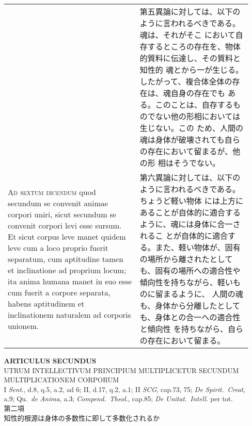 \documentclass[paper=a4paper,fontsize=10pt,jafontsize=9pt,titlepage]{jlreq}
\begin{document}
\begin{longtable}{p{21em}p{21em}}
&

 第五異論に対しては、以下のように言われるべきである。魂は、それがそこ
 において自存するところの存在を、物体的質料に伝達し、その質料と知性的
 魂とから一が生じる。したがって、複合体全体の存在は、魂自身の存在でも
 ある。このことは、自存するものでない他の形相においては生じない。この
 ため、人間の魂は身体が破壊されても自らの存在において留まるが、他の形
 相はそうでない。
 
\\


 {\scshape Ad sextum dicendum} quod secundum se convenit animae
 corpori uniri, sicut secundum se convenit corpori levi esse
 sursum. Et sicut corpus leve manet quidem leve cum a loco proprio
 fuerit separatum, cum aptitudine tamen et inclinatione ad proprium
 locum; ita anima humana manet in suo esse cum fuerit a corpore
 separata, habens aptitudinem et inclinationem naturalem ad corporis
 unionem.
 
&

 第六異論に対しては、以下のように言われるべきである。ちょうど軽い物体
 には上方にあることが自体的に適合するように、魂には身体に合一されるこ
 とが自体的に適合する。また、軽い物体が、固有の場所から離されたとして
 も、固有の場所への適合性や傾向性を持ちながら、軽いものに留まるように、
 人間の魂も、身体から分離したとしても、身体との合一への適合性と傾向性
 を持ちながら、自らの存在において留まる。

\end{longtable}
\newpage


\begin{center}
{\Large {\bfseries ARTICULUS SECUNDUS}}\\
{\large UTRUM INTELLECTIVUM PRINCIPIUM MULTIPLICETUR SECUNDUM MULTIPLICATIONEM CORPORUM}\\
{\footnotesize I {\itshape Sent}., d.8, q.5, a.2, ad 6; II, d.17, q.2, a.1; II {\itshape SCG}, cap.73, 75; {\itshape De Spirit.~Creat}, a.9; Qu.~{\itshape de Anima}, a.3; {\itshape Compend.~Theol.}, cap.85; {\itshape De Unitat.~Intell.} per tot.}\\
{\Large 第二項\\知性的根源は身体の多数性に即して多数化されるか}
\end{center}
\end{document}

